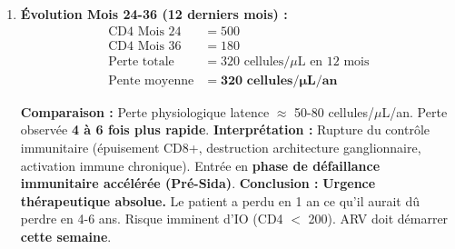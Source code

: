 \documentclass[11pt]{article}
\begin{document}
\begin{exoresolu}
\begin{enumerate}
    \textbf{Importance :} Le \emph{set point} reflète l'équilibre entre réplication virale et réponse immune (CTL CD8+). Un set point bas ($<$ 10 000 copies/mL = 4 log) = « Contrôleur élite » ou bon pronostic (lente progression). Un set point haut ($>$ 100 000 = 5 log) = progression rapide vers Sida. Ici set point $\sim$ 4,7 log = progression \textbf{intermédiaire/modérée}.
    
    \item \textbf{Évolution Mois 24-36 (12 derniers mois) :}
    \begin{align*}
    \text{CD4 Mois 24} &= 500 \\
    \text{CD4 Mois 36} &= 180 \\
    \text{Perte totale} &= 320 \text{ cellules/$\mu$L en 12 mois} \\
    \text{Pente moyenne} &= \mathbf{320 \text{ cellules/$\mu$L/an}}
    \end{align*}
    
    \textbf{Comparaison :} Perte physiologique latence $\approx$ 50-80 cellules/$\mu$L/an. Perte observée \textbf{4 à 6 fois plus rapide}.
    \textbf{Interprétation :} Rupture du contrôle immunitaire (épuisement CD8+, destruction architecture ganglionnaire, activation immune chronique). Entrée en \textbf{phase de défaillance immunitaire accélérée (Pré-Sida)}.
    \textbf{Conclusion :} \textbf{Urgence thérapeutique absolue.} Le patient a perdu en 1 an ce qu'il aurait dû perdre en 4-6 ans. Risque imminent d'IO (CD4 $<$ 200). ARV doit démarrer \textbf{cette semaine}.
    
\end{enumerate}


\end{exoresolu}
\end{document}
